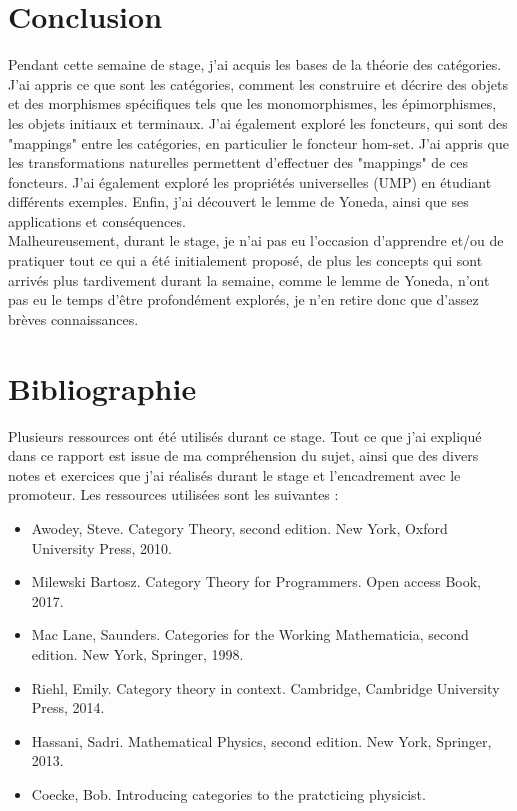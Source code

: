 \documentclass{article}
\begin{document}
\newpage
\section{Conclusion}
Pendant cette semaine de stage, j'ai acquis les bases de la théorie des catégories. J'ai appris ce que sont les catégories, comment les construire et décrire des objets et des morphismes spécifiques tels que les monomorphismes, les épimorphismes, les objets initiaux et terminaux. J'ai également exploré les foncteurs, qui sont des "mappings" entre les catégories, en particulier le foncteur hom-set. J'ai appris que les transformations naturelles permettent d'effectuer des "mappings" de ces foncteurs. J'ai également exploré les propriétés universelles (UMP) en étudiant différents exemples. Enfin, j'ai découvert le lemme de Yoneda, ainsi que ses applications et conséquences.\\

Malheureusement, durant le stage, je n'ai pas eu l'occasion d'apprendre et/ou de pratiquer tout ce qui a été initialement proposé, de plus les concepts qui sont arrivés plus tardivement durant la semaine, comme le lemme de Yoneda, n'ont pas eu le temps d'être profondément explorés, je n'en retire donc que d'assez brèves connaissances.

\section{Bibliographie}
Plusieurs ressources ont été utilisés durant ce stage. Tout ce que j'ai expliqué dans ce rapport est issue de ma compréhension du sujet, ainsi que des divers notes et exercices que j'ai réalisés durant le stage et l'encadrement avec le promoteur. Les ressources utilisées sont les suivantes :

\begin{itemize}
    \item Awodey, Steve. Category Theory, second edition. New York, Oxford University Press, 2010.
    \item Milewski Bartosz. Category Theory for Programmers. Open access Book, 2017.
    \item Mac Lane, Saunders. Categories for the Working Mathematicia, second edition. New York, Springer, 1998.
    \item Riehl, Emily. Category theory in context. Cambridge, Cambridge University Press, 2014.
    \item Hassani, Sadri. Mathematical Physics, second edition. New York, Springer, 2013.
    \item Coecke, Bob. Introducing categories to the pratcticing physicist.
\end{itemize}

\sectionline
\end{document}

